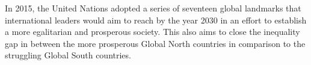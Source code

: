 In 2015, the United Nations adopted a series of seventeen global landmarks that international leaders would aim to reach by the year 2030 in an effort to establish a more egalitarian and prosperous society. This also aims to close the inequality gap in between the more prosperous Global North countries in comparison to the struggling Global South countries.